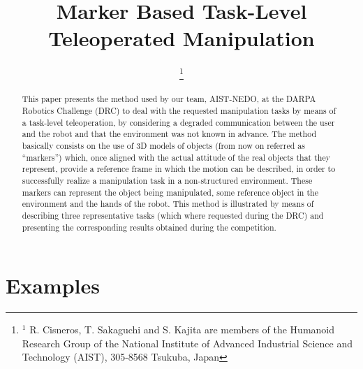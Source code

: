 \documentclass[letterpaper, 10 pt, conference]{ieeeconf}
\begin{document}
	\title{\LARGE \bf Marker Based Task-Level Teleoperated Manipulation}

	\author{
		\and
		\and
		\thanks{$^{1}$ R. Cisneros, T. Sakaguchi and S. Kajita are members of the
						Humanoid Research Group of the National Institute of Advanced Industrial Science
						and Technology (AIST), 305-8568 Tsukuba, Japan}}
  
	\maketitle

	\thispagestyle{empty}
	\pagestyle{empty}

	\begin{abstract}
		This paper presents the method used by our team, AIST-NEDO, at the DARPA Robotics Challenge (DRC) to deal with
		the requested manipulation tasks by means of a task-level teleoperation, by considering a degraded communication
		between the user and the robot and that the environment was not known in advance.
		The method basically consists on the use of 3D models of objects (from now on referred as ``markers'') which,
		once aligned with the actual attitude of the real objects that they represent, provide a reference frame in
		which the motion can be described, in order to successfully realize a manipulation task in a non-structured
		environment.
		These markers can represent the object being manipulated, some reference object in the environment and the
		hands of the robot.
		This method is illustrated by means of describing three representative tasks (which where requested during the DRC)
		and presenting the corresponding results obtained during the competition.
	\end{abstract}

	
	
		
		
	
		
	\section{Examples}
		
		
		
		
		
		
		
	
	
	
	
	
	
	
\end{document}
